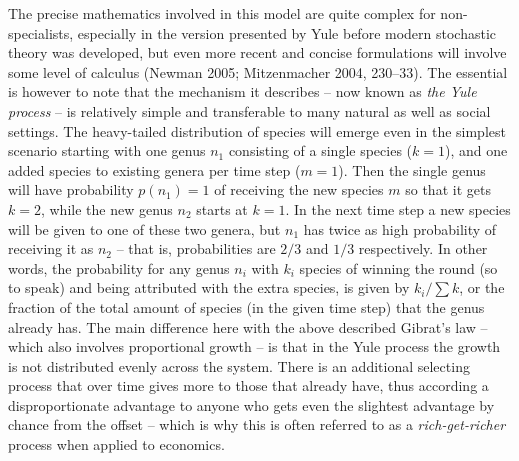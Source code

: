 \documentclass[
  12pt,
  a4paper, twoside]{book}
\begin{document}
The precise mathematics involved in this model are quite complex for non-specialists, especially in the version presented by Yule before modern stochastic theory was developed, but even more recent and concise formulations will involve some level of calculus (Newman 2005; Mitzenmacher 2004, 230--33). The essential is however to note that the mechanism it describes -- now known as \emph{the Yule process} -- is relatively simple and transferable to many natural as well as social settings. The heavy-tailed distribution of species will emerge even in the simplest scenario starting with one genus \(n_1\) consisting of a single species (\(k = 1\)), and one added species to existing genera per time step (\(m = 1\)). Then the single genus will have probability \(p(n_1) = 1\) of receiving the new species \(m\) so that it gets \(k = 2\), while the new genus \(n_2\) starts at \(k = 1\). In the next time step a new species will be given to one of these two genera, but \(n_1\) has twice as high probability of receiving it as \(n_2\) -- that is, probabilities are \(2/3\) and \(1/3\) respectively. In other words, the probability for any genus \(n_{i}\) with \(k_i\) species of winning the round (so to speak) and being attributed with the extra species, is given by \(k_i/\sum{k}\), or the fraction of the total amount of species (in the given time step) that the genus already has. The main difference here with the above described Gibrat's law -- which also involves proportional growth -- is that in the Yule process the growth is not distributed evenly across the system. There is an additional selecting process that over time gives more to those that already have, thus according a disproportionate advantage to anyone who gets even the slightest advantage by chance from the offset -- which is why this is often referred to as a \emph{rich-get-richer} process when applied to economics.
\end{document}
